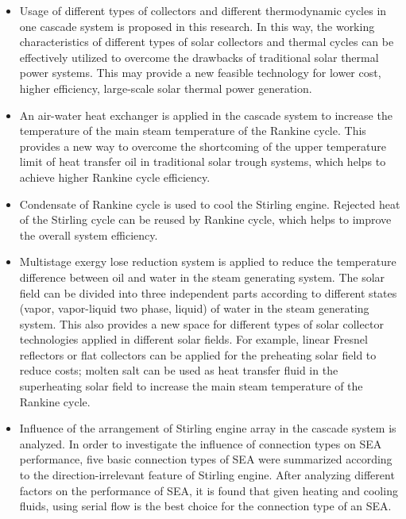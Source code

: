 \begin{itemize}
  \item Usage of different types of collectors and different thermodynamic cycles in one cascade system is proposed in this research. In this way, the working characteristics of different types of solar collectors and thermal cycles can be effectively utilized to overcome the drawbacks of traditional solar thermal power systems. This may provide a new feasible technology for lower cost, higher efficiency, large-scale solar thermal power generation.
  \item An air-water heat exchanger is applied in the cascade system to increase the temperature of the main steam temperature of the Rankine cycle. This provides a new way to overcome the shortcoming of the upper temperature limit of heat transfer oil in traditional solar trough systems, which helps to achieve higher Rankine cycle efficiency.
  \item Condensate of Rankine cycle is used to cool the Stirling engine. Rejected heat of the Stirling cycle can be reused by Rankine cycle, which helps to improve the overall system efficiency. 
  \item Multistage exergy lose reduction system is applied to reduce the temperature difference between oil and water in the steam generating system. The solar field can be divided into three independent parts according to different states (vapor, vapor-liquid two phase, liquid) of water in the steam generating system. This also provides a new space for different types of solar collector technologies applied in different solar fields. For example, linear Fresnel reflectors or flat collectors can be applied for the preheating solar field to reduce costs; molten salt can be used as heat transfer fluid in the superheating solar field to increase the main steam temperature of the Rankine cycle.
  \item Influence of the arrangement of Stirling engine array in the cascade system is analyzed. In order to investigate the influence of connection types on SEA performance, five basic connection types of SEA were summarized according to the direction-irrelevant feature of Stirling engine. After
analyzing different factors on the performance of SEA, it is found that given heating and cooling fluids, using serial flow is the best choice for the connection type of an SEA.
\end{itemize}

\newpage
